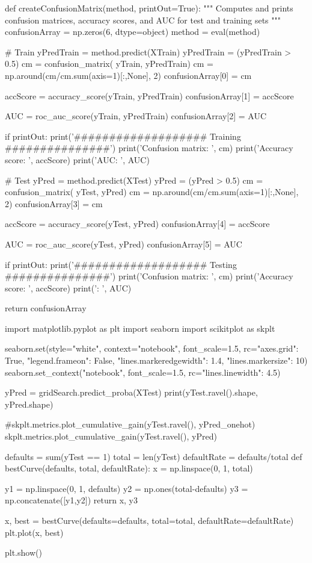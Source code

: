 \documentclass[%
oneside,                 %
final,                   %
10pt]{article}
\begin{document}
def createConfusionMatrix(method, printOut=True):
    """
    Computes and prints confusion matrices, accuracy scores,
    and AUC for test and training sets 
    """
    confusionArray = np.zeros(6, dtype=object)
    method = eval(method)
    
    # Train
    yPredTrain = method.predict(XTrain)
    yPredTrain = (yPredTrain > 0.5)
    cm = confusion_matrix(
        yTrain, yPredTrain) 
    cm = np.around(cm/cm.sum(axis=1)[:,None], 2)
    confusionArray[0] = cm
    
    accScore = accuracy_score(yTrain, yPredTrain)
    confusionArray[1] = accScore
    
    AUC = roc_auc_score(yTrain, yPredTrain)
    confusionArray[2] = AUC
    
    if printOut:
        print('\n###################  Training  ###############')
        print('\nTraining Confusion matrix: \n', cm)
        print('\nTraining Accuracy score: \n', accScore)
        print('\nTrain AUC: \n', AUC)
    
    # Test
    yPred = method.predict(XTest)
    yPred = (yPred > 0.5)
    cm = confusion_matrix(
        yTest, yPred) 
    cm = np.around(cm/cm.sum(axis=1)[:,None], 2)
    confusionArray[3] = cm
    
    accScore = accuracy_score(yTest, yPred)
    confusionArray[4] = accScore
    
    AUC = roc_auc_score(yTest, yPred)
    confusionArray[5] = AUC
    
    if printOut:
        print('\n###################  Testing  ###############')
        print('\nTest Confusion matrix: \n', cm)
        print('\nTest Accuracy score: \n', accScore)
        print('\nTestAUC: \n', AUC)    
    
    return confusionArray


import matplotlib.pyplot as plt
import seaborn
import scikitplot as skplt

seaborn.set(style="white", context="notebook", font_scale=1.5, 
            rc={"axes.grid": True, "legend.frameon": False,
"lines.markeredgewidth": 1.4, "lines.markersize": 10})
seaborn.set_context("notebook", font_scale=1.5, rc={"lines.linewidth": 4.5})

yPred = gridSearch.predict_proba(XTest) 
print(yTest.ravel().shape, yPred.shape)

#skplt.metrics.plot_cumulative_gain(yTest.ravel(), yPred_onehot)
skplt.metrics.plot_cumulative_gain(yTest.ravel(), yPred)

defaults = sum(yTest == 1)
total = len(yTest)
defaultRate = defaults/total
def bestCurve(defaults, total, defaultRate):
    x = np.linspace(0, 1, total)
    
    y1 = np.linspace(0, 1, defaults)
    y2 = np.ones(total-defaults)
    y3 = np.concatenate([y1,y2])
    return x, y3

x, best = bestCurve(defaults=defaults, total=total, defaultRate=defaultRate)    
plt.plot(x, best)    


plt.show()

\epycod


\end{document}
